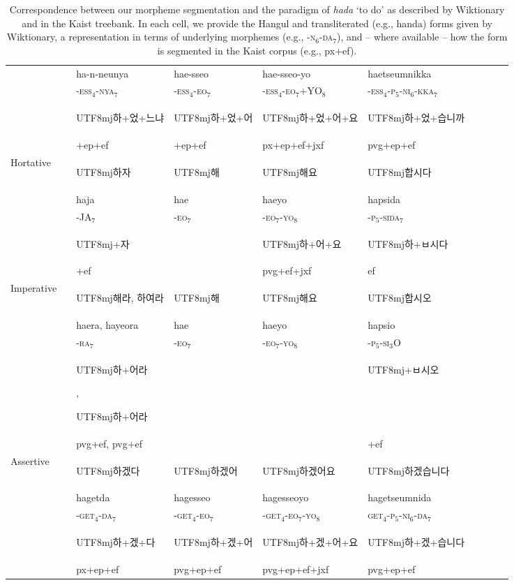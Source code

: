 \documentclass[11pt,letterpaper]{article}
\newcommand{\korean}[1]{\begin{CJK}{UTF8}{mj}#1\end{CJK}}
\begin{document}
\begin{table}
\begin{tabular}{llllllllll}
              &  & ha-n-neunya &  hae-sseo &  hae-sseo-yo &  haetseumnikka\\
              &  & -\textsc{ess}$_4$-\textsc{nya}$_7$ &  -\textsc{ess}$_4$-\textsc{eo}$_7$ &  -\textsc{ess}$_4$-\textsc{eo}$_7$+YO$_8$ &  -\textsc{ess}$_4$-\textsc{p}$_5$-\textsc{ni}$_6$-\textsc{kka}$_7$\\
              &  &  \korean{하+었+느냐}  & \korean{하+었+어} & \korean{하+었+어+요} & \korean{하+었+습니까} \\
              &  & +ep+ef  & +ep+ef            & px+ep+ef+jxf & pvg+ep+ef \\
              \hline
Hortative   && \korean{하자}  & \korean{해}  & \korean{해요}  & \korean{합시다}  \\
   && haja &  hae &  haeyo & hapsida \\
   && -JA$_7$ &  -\textsc{eo}$_7$ &  -\textsc{eo}$_7$-\textsc{yo}$_8$ & -\textsc{p}$_5$-\textsc{sida}$_7$ \\
   && \korean{+자} && \korean{하+어+요} & \korean{하+ㅂ시다}\\
   && +ef  && pvg+ef+jxf & ef \\
   \hline
Imperative  && \korean{해라, 하여라}  & \korean{해}  & \korean{해요}  & \korean{합시오}  \\
  && haera, hayeora &  hae &  haeyo &  hapsio \\
  && -\textsc{ra}$_7$ & -\textsc{eo}$_7$ & -\textsc{eo}$_7$-\textsc{yo}$_8$ & -\textsc{p}$_5$-\textsc{si}$_3$O \\
  && \korean{하+어라}, \korean{하+어라}  &  &    & \korean{+ㅂ시오} \\
  && pvg+ef,  pvg+ef                     &  &    &  +ef\\
  \hline
Assertive   && \korean{하겠다}  & \korean{하겠어}  & \korean{하겠어요}  & \korean{하겠습니다}  \\
   &&  hagetda & hagesseo &  hagesseoyo & hagetseumnida \\
   &&  -\textsc{get}$_4$-\textsc{da}$_7$ & -\textsc{get}$_4$-\textsc{eo}$_7$ &  -\textsc{get}$_4$-\textsc{eo}$_7$-\textsc{yo}$_8$ & \textsc{get}$_4$-\textsc{p}$_5$-\textsc{ni}$_6$-\textsc{da}$_7$ \\
&& \korean{하+겠+다}  & \korean{하+겠+어}   & \korean{하+겠+어+요} & \korean{하+겠+습니다}\\
&&  px+ep+ef          & pvg+ep+ef   & pvg+ep+ef+jxf & pvg+ep+ef\\
\hline
\end{tabular}
	\caption{Correspondence between our morpheme segmentation and the paradigm of \textit{hada} `to do' as described by Wiktionary and in the Kaist treebank. In each cell, we provide the Hangul  and transliterated (e.g., handa) forms given by Wiktionary, a representation in terms of underlying morphemes (e.g., -\textsc{n}$_6$-\textsc{da}$_7$), and -- where available -- how the form is segmented in the Kaist corpus (e.g., px+ef).}\label{tab:korean-hada-1} %
\end{table}
\end{document}
